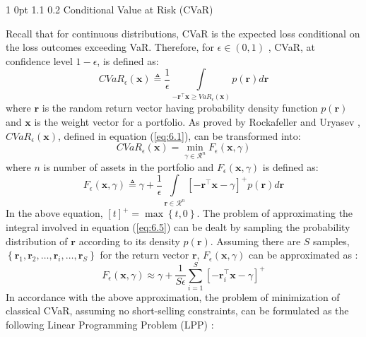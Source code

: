 \documentclass[12pt]{article}
\makeatletter
\numberwithin{equation}{section}
\renewcommand{\subsection}{
  \@startsection
  {subsection}%
  {1}%
  {0pt}%
  {1.1\baselineskip}%
  {0.2\baselineskip}%
  {\sc \centering}%
}
\makeatother
\begin{document}
\subsection {Conditional Value at Risk (CVaR)}

Recall that for continuous distributions, CVaR is the expected loss conditional on the loss outcomes exceeding VaR. Therefore, for $\epsilon \in (0,1)$ , CVaR, at confidence level $1-\epsilon$, is defined as:
\begin{equation}
CVaR_{\epsilon}(\mathbf{x}) \triangleq \frac{1}{\epsilon} \int \limits_{-\mathbf{r}^{\top}\mathbf{x} \geq VaR_{\epsilon}(\mathbf{x})}
p(\mathbf{r}) d\mathbf{r}
\label{eq:6.1}
\end{equation}
where $\mathbf{r}$ is the random return vector having probability density function $p(\mathbf{r})$ and $\mathbf{x}$ is the weight vector for a portfolio. As proved by Rockafeller and Uryasev \cite{rockafellar1} , $CVaR_{\epsilon}(\mathbf{x})$, defined in equation (\ref{eq:6.1}), can be transformed into:
\begin{equation}
CVaR_{\epsilon}(\mathbf{x})=\min_{\gamma \in \mathcal{R}^{n}} F_{\epsilon}(\mathbf{x},\gamma)
\label{eq:6.4}
\end{equation}
where $n$ is number of assets in the portfolio and $F_{\epsilon}(\mathbf{x},\gamma)$ is defined as:
\begin{equation}
F_{\epsilon}(\mathbf{x},\gamma) \triangleq \gamma+\frac{1}{\epsilon} \int \limits_{\mathbf{r} \in \mathcal{R}^{n}}
\left[-\mathbf{r}^{\top}\mathbf{x}-\gamma\right]^{+} p(\mathbf{r}) d\mathbf{r}
\label{eq:6.5}
\end{equation}
In the above equation, $\left[t\right]^{+}=\max \left\{t,0\right\}$. The problem of approximating the integral involved in equation (\ref{eq:6.5}) can be dealt by sampling the probability distribution of $\mathbf{r}$ according to its density $p(\mathbf{r})$. Assuming there are $S$ samples, $\displaystyle{\left\{\mathbf{r}_{1},\mathbf{r}_{2},\dots,\mathbf{r}_{i},\dots,\mathbf{r}_{S}\right\}}$ for the return vector $\mathbf{r}$,
$F_{\epsilon}(\mathbf{x},\gamma)$ can be approximated as \cite{rockafellar1}:
\begin{equation}
F_{\epsilon}(\mathbf{x},\gamma) \approx \gamma+\frac{1}{S\epsilon}\sum\limits_{i=1}^{S} \left[-\mathbf{r}_{i}^{\top}\mathbf{x}-\gamma\right]^{+}
\label{eq:6.6}
\end{equation}
In accordance with the above approximation, the problem of minimization of classical CVaR, assuming no short-selling constraints, can be formulated as the following Linear Programming Problem (LPP) \cite{rockafellar1,zhu}:
\end{document}
